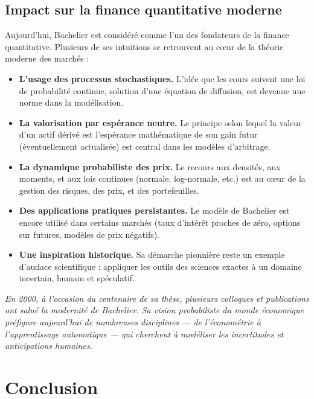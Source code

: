 \documentclass[12pt,a4paper]{article}
\begin{document}
\subsection{Impact sur la finance quantitative moderne}

Aujourd’hui, Bachelier est considéré comme l’un des fondateurs de la finance quantitative. Plusieurs de ses intuitions se retrouvent au cœur de la théorie moderne des marchés :

\begin{itemize}
    \item \textbf{L’usage des processus stochastiques.} L’idée que les cours suivent une loi de probabilité continue, solution d’une équation de diffusion, est devenue une norme dans la modélisation.

    \item \textbf{La valorisation par espérance neutre.} Le principe selon lequel la valeur d’un actif dérivé est l’espérance mathématique de son gain futur (éventuellement actualisée) est central dans les modèles d’arbitrage.

    \item \textbf{La dynamique probabiliste des prix.} Le recours aux densités, aux moments, et aux lois continues (normale, log-normale, etc.) est au cœur de la gestion des risques, des prix, et des portefeuilles.

    \item \textbf{Des applications pratiques persistantes.} Le modèle de Bachelier est encore utilisé dans certains marchés (taux d’intérêt proches de zéro, options sur futures, modèles de prix négatifs).

    \item \textbf{Une inspiration historique.} Sa démarche pionnière reste un exemple d'audace scientifique : appliquer les outils des sciences exactes à un domaine incertain, humain et spéculatif.
\end{itemize}

\textit{
En 2000, à l'occasion du centenaire de sa thèse, plusieurs colloques et publications ont salué la modernité de Bachelier. Sa vision probabiliste du monde économique préfigure aujourd’hui de nombreuses disciplines — de l’économétrie à l’apprentissage automatique — qui cherchent à modéliser les incertitudes et anticipations humaines.
}

\section{Conclusion}
\end{document}
